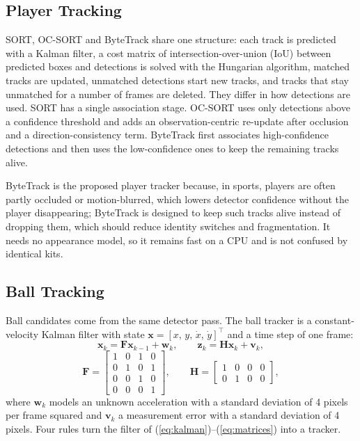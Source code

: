 \documentclass[conference]{IEEEtran}
\begin{document}
\subsection{Player Tracking}
SORT, OC-SORT and ByteTrack share one structure: each track is predicted with a
Kalman filter, a cost matrix of intersection-over-union (IoU) between predicted
boxes and detections is solved with the Hungarian algorithm, matched tracks are
updated, unmatched detections start new tracks, and tracks that stay unmatched
for a number of frames are deleted. They differ in how detections are used.
SORT has a single association stage. OC-SORT uses only detections above a
confidence threshold and adds an observation-centric re-update after occlusion
and a direction-consistency term. ByteTrack first associates high-confidence
detections and then uses the low-confidence ones to keep the remaining tracks
alive.

ByteTrack is the proposed player tracker because, in sports, players are often
partly occluded or motion-blurred, which lowers detector confidence without the
player disappearing; ByteTrack is designed to keep such tracks alive instead of
dropping them, which should reduce identity switches and fragmentation. It needs
no appearance model, so it remains fast on a CPU and is not confused by identical
kits.

\subsection{Ball Tracking}
Ball candidates come from the same detector pass. The ball tracker is a
constant-velocity Kalman filter with state
$\mathbf{x}=[x,\,y,\,\dot{x},\,\dot{y}]^{\top}$ and a time step of one frame:
\begin{equation}
\mathbf{x}_{k}=\mathbf{F}\mathbf{x}_{k-1}+\mathbf{w}_{k},\qquad
\mathbf{z}_{k}=\mathbf{H}\mathbf{x}_{k}+\mathbf{v}_{k},
\label{eq:kalman}
\end{equation}
\begin{equation}
\mathbf{F}=\begin{bmatrix}1&0&1&0\\0&1&0&1\\0&0&1&0\\0&0&0&1\end{bmatrix},\qquad
\mathbf{H}=\begin{bmatrix}1&0&0&0\\0&1&0&0\end{bmatrix},
\label{eq:matrices}
\end{equation}
where $\mathbf{w}_{k}$ models an unknown acceleration with a standard deviation
of 4 pixels per frame squared and $\mathbf{v}_{k}$ a measurement error with a
standard deviation of 4 pixels. Four rules turn the filter of
(\ref{eq:kalman})--(\ref{eq:matrices}) into a tracker.
\end{document}
